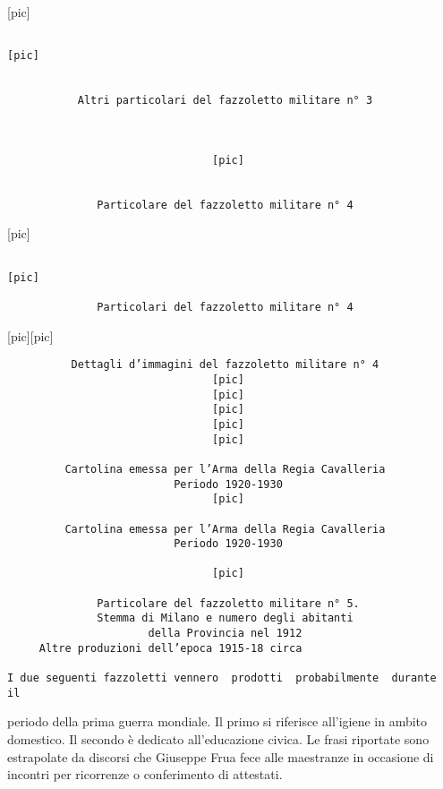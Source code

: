 {[}pic{]}

\begin{verbatim}
                                                                   [pic]


           Altri particolari del fazzoletto militare n° 3



                                [pic]


              Particolare del fazzoletto militare n° 4
\end{verbatim}

{[}pic{]}

\begin{verbatim}
                                                                   [pic]

              Particolari del fazzoletto militare n° 4
\end{verbatim}

{[}pic{]}{[}pic{]}

\begin{verbatim}
          Dettagli d’immagini del fazzoletto militare n° 4
                                [pic]
                                [pic]
                                [pic]
                                [pic]
                                [pic]

         Cartolina emessa per l’Arma della Regia Cavalleria
                          Periodo 1920-1930
                                [pic]

         Cartolina emessa per l’Arma della Regia Cavalleria
                          Periodo 1920-1930

                                [pic]

              Particolare del fazzoletto militare n° 5.
              Stemma di Milano e numero degli abitanti
                      della Provincia nel 1912
     Altre produzioni dell’epoca 1915-18 circa

I due seguenti fazzoletti vennero  prodotti  probabilmente  durante   il
\end{verbatim}

periodo della prima guerra mondiale. Il primo si riferisce all'igiene in
ambito domestico. Il secondo è dedicato all'educazione civica. Le frasi
riportate sono estrapolate da discorsi che Giuseppe Frua fece alle
maestranze in occasione di incontri per ricorrenze o conferimento di
attestati.

